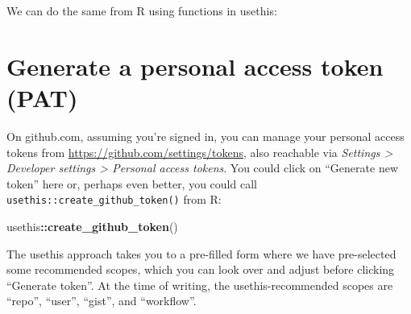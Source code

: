 \documentclass[
]{book}
\newenvironment{Shaded}{\begin{snugshade}}{\end{snugshade}}
\newcommand{\AttributeTok}[1]{\textcolor[rgb]{0.13,0.29,0.53}{#1}}
\newcommand{\CommentTok}[1]{\textcolor[rgb]{0.56,0.35,0.01}{\textit{#1}}}
\newcommand{\ConstantTok}[1]{\textcolor[rgb]{0.56,0.35,0.01}{#1}}
\newcommand{\FunctionTok}[1]{\textcolor[rgb]{0.13,0.29,0.53}{\textbf{#1}}}
\newcommand{\NormalTok}[1]{#1}
\newcommand{\SpecialCharTok}[1]{\textcolor[rgb]{0.81,0.36,0.00}{\textbf{#1}}}
\newcommand{\StringTok}[1]{\textcolor[rgb]{0.31,0.60,0.02}{#1}}
\begin{document}
We can do the same from R using functions in usethis:

\begin{Shaded}
\end{Shaded}

\section{Generate a personal access token (PAT)}\label{get-a-pat}

On github.com, assuming you're signed in, you can manage your personal access tokens from \url{https://github.com/settings/tokens}, also reachable via \emph{Settings \textgreater{} Developer settings \textgreater{} Personal access tokens}.
You could click on ``Generate new token'' here or, perhaps even better, you could call \texttt{usethis::create\_github\_token()} from R:

\begin{Shaded}
\begin{Highlighting}[]
\NormalTok{usethis}\SpecialCharTok{::}\FunctionTok{create\_github\_token}\NormalTok{()}
\end{Highlighting}
\end{Shaded}

The usethis approach takes you to a pre-filled form where we have pre-selected some recommended scopes, which you can look over and adjust before clicking ``Generate token''.
At the time of writing, the usethis-recommended scopes are ``repo'', ``user'', ``gist'', and ``workflow''.
\end{document}
